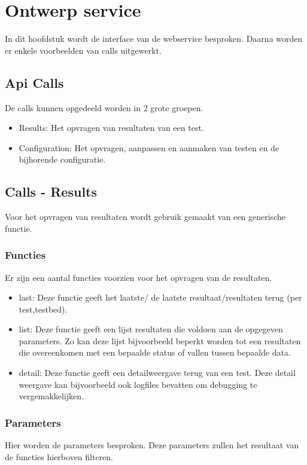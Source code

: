 \newpage
\chapter{Ontwerp service}

In dit hoofdstuk wordt de interface van de webservice besproken. Daarna worden er enkele voorbeelden van calls uitgewerkt.

\section{Api Calls}
De calls kunnen opgedeeld worden in 2 grote groepen.
\begin{itemize}
\item Results: Het opvragen van resultaten van een test.
\item Configuration: Het opvragen, aanpassen en aanmaken van testen en de bijhorende configuratie.
\end{itemize}

\section{Calls - Results}
Voor het opvragen van resultaten wordt gebruik gemaakt van een generische functie.

\subsection{Functies}
Er zijn een aantal functies voorzien voor het opvragen van de resultaten.
\begin{itemize}
\item last: Deze functie geeft het laatste/ de laatste resultaat/resultaten terug (per test,testbed).
\item list: Deze functie geeft een lijst resultaten die voldoen aan de opgegeven parameters. 
Zo kan deze lijst bijvoorbeeld beperkt worden tot een resultaten die overeenkomen met een bepaalde status of vallen tussen bepaalde data.
\item detail: Deze functie geeft een detailweergave terug van een test. Deze detail weergave kan bijvoorbeeld ook logfiles bevatten om debugging te vergemakkelijken.
\end{itemize}

\subsection{Parameters}
Hier worden de parameters besproken. Deze parameters zullen het resultaat van de functies hierboven filteren.

